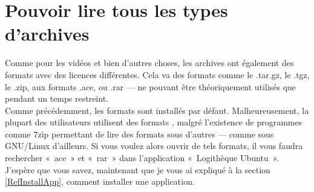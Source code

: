 \section{Pouvoir lire tous les types d'archives}
Comme pour les vidéos et bien d'autres choses, les archives ont également des formats avec des licences différentes. Cela va des formats  comme le .tar.gz, le .tgz, le .zip, aux formats  .ace, ou .rar --- ne pouvant être théoriquement utilisés que pendant un temps restreint.\\
Comme précédemment, les formats  sont installés par défaut. Malheureusement, la plupart des utilisateurs utilisent des formats , malgré l'existence de programmes comme 7zip permettant de lire des formats  sous d'autres  --- comme sous GNU/Linux d'ailleurs. Si vous voulez alors ouvrir de tels formats, il vous faudra rechercher «~ace~» et «~rar~» dans l'application «~Logithèque Ubuntu~». J'espère que vous savez, maintenant que je vous ai expliqué à la section \ref{RefInstallApp}, comment installer une application.
